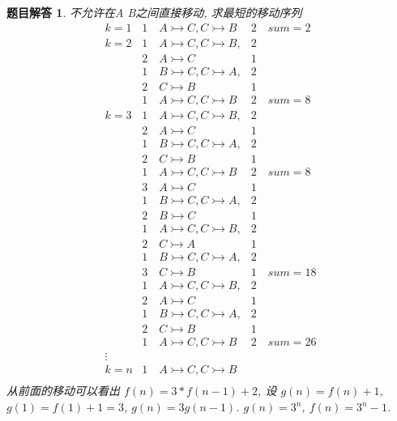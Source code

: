 \documentclass[mode=geye]{elegantnote}
\newtheorem{answer}{题目解答}
\begin{document}
\begin{answer}
	不允许在A B之间直接移动, 求最短的移动序列
	\begin{equation*}
	\begin{array}{cll}
		k=1     & 1\quad A \rightarrowtail C, C \rightarrowtail B   & 2 \quad sum=2\\
		k=2     & 1\quad A \rightarrowtail C, C \rightarrowtail B,  & 2	\\
				& 2\quad A \rightarrowtail C                 		& 1	\\
			 	& 1\quad B \rightarrowtail C, C \rightarrowtail A,  & 2	\\
			 	& 2\quad C \rightarrowtail B						& 1	\\
			 	& 1\quad A \rightarrowtail C, C \rightarrowtail B   & 2 \quad sum=8 \\
		k=3     & 1\quad A \rightarrowtail C, C \rightarrowtail B,  & 2	\\
				& 2\quad A \rightarrowtail C                 		& 1	\\
				& 1\quad B \rightarrowtail C, C \rightarrowtail A,  & 2	\\
				& 2\quad C \rightarrowtail B						& 1	\\
				& 1\quad A \rightarrowtail C, C \rightarrowtail B   & 2 \quad sum=8\\
				& 3\quad A \rightarrowtail C                 		& 1	\\
				& 1\quad B \rightarrowtail C, C \rightarrowtail A,  & 2	\\
				& 2\quad B \rightarrowtail C						& 1	\\
				& 1\quad A \rightarrowtail C, C \rightarrowtail B,  & 2	\\
				& 2\quad C \rightarrowtail A						& 1	\\
				& 1\quad B \rightarrowtail C, C \rightarrowtail A,  & 2	\\
				& 3\quad C \rightarrowtail B						& 1	\quad sum=18\\
				& 1\quad A \rightarrowtail C, C \rightarrowtail B,  & 2	\\
				& 2\quad A \rightarrowtail C                 		& 1	\\
				& 1\quad B \rightarrowtail C, C \rightarrowtail A,  & 2	\\
				& 2\quad C \rightarrowtail B						& 1	\\
				& 1\quad A \rightarrowtail C, C \rightarrowtail B   & 2 \quad sum=26\\
		\vdots  &													& \\
		k=n     & 1\quad A \rightarrowtail C, C \rightarrowtail B	&  \\
	\end{array}
	\end{equation*}
	从前面的移动可以看出 $ f(n) = 3*f(n-1)+2 $, 设 $ g(n) = f(n)+1 $, $ g(1)=f(1)+1 = 3 $, $ g(n) = 3g(n-1) $. $ g(n) = 3^{n} $, $ f(n) = 3^{n}-1 $.
\end{answer}
\end{document}
